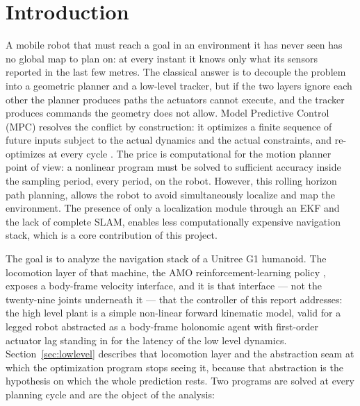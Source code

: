 \documentclass[11pt,a4paper]{article}
\begin{document}


\tableofcontents
\vspace{10pt}

\section{Introduction}
\label{sec:intro}

A mobile robot that must reach a goal in an environment it has never seen has no global map to plan on: at
every instant it knows only what its sensors reported in the last few metres. The classical answer is to
decouple the problem into a geometric planner and a low-level tracker, but if the two layers ignore each
other the planner produces paths the actuators cannot execute, and the tracker produces commands the geometry
does not allow. Model Predictive Control (MPC) resolves the conflict by construction: it optimizes a finite
sequence of future inputs subject to the actual dynamics and the actual constraints, and re-optimizes at every
cycle \cite{rawlings2017mpc}. The price is computational for the motion planner point of view: a nonlinear program must be solved to sufficient
accuracy inside the sampling period, every period, on the robot. However, this rolling horizon path planning, allows the robot to avoid simultaneously localize and map the environment. The presence of only a localization module through an EKF and the lack of complete SLAM, enables less computationally expensive navigation stack, which is a core contribution of this project.

The goal is to analyze the navigation stack of a Unitree G1 humanoid. The locomotion layer of that machine,
the AMO reinforcement-learning policy \cite{li2025amo}, exposes a body-frame velocity interface, and it is
that interface --- not the twenty-nine joints underneath it --- that the controller of this report addresses:
the high level plant is a simple non-linear forward kinematic model, valid for a legged robot abstracted as a
body-frame holonomic agent with first-order actuator lag standing in for the latency of the low level
dynamics. Section~\ref{sec:lowlevel} describes that locomotion layer and the abstraction seam at which the
optimization program stops seeing it, because that abstraction is the hypothesis on which the whole
prediction rests. Two programs are solved at every planning cycle and are the object of the analysis:
\end{document}
